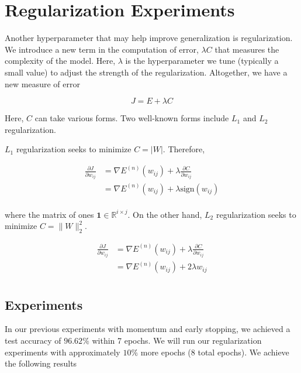 \section{Regularization Experiments}

Another hyperparameter that may help improve generalization is
regularization. We introduce a new term in the computation of error, $\lambda C$
that measures the complexity of the model. Here, $\lambda$ is the
hyperparameter we tune (typically a small value) to adjust the
strength of the regularization. Altogether, we have a new measure of error

\begin{equation*}
	J = E + \lambda C
\end{equation*}

Here, $C$ can take various forms. Two well-known forms include $L_1$ and $L_2$
regularization.

$L_1$ regularization seeks to minimize $C = |W|$. Therefore,

\begin{equation*}
	\begin{aligned}
		\frac{\partial J}{\partial w_{ij}} & = \nabla E^{(n)}(w_{ij}) + \lambda
		\frac{\partial C}{\partial w_{ij}}                                      \\
		                                   & = \nabla E^{(n)}(w_{ij}) + \lambda
		\text{sign}  (w_{ij})                                                   \\
	\end{aligned}
	\label{eq:l1_l2}
\end{equation*}

where the matrix of ones $\mathbf{1} \in \mathbb{R}^{i \times j}$. On the other
hand, $L_2$ regularization seeks to minimize $C = \| W \|^2_2$.

\begin{equation*}
	\begin{aligned}
		\frac{\partial J}{\partial w_{ij}} & = \nabla E^{(n)}(w_{ij}) + \lambda
		\frac{\partial C}{\partial w_{ij}}                                        \\
		                                   & = \nabla E^{(n)}(w_{ij}) + 2 \lambda
		w_{ij}                                                                    \\
	\end{aligned}
\end{equation*}

\subsection{Experiments}
In our previous experiments with momentum and early stopping, we achieved a test
accuracy of $96.62\%$ within 7 epochs. We will run our regularization
experiments with approximately $10\%$ more epochs (8 total epochs). We achieve
the following results

